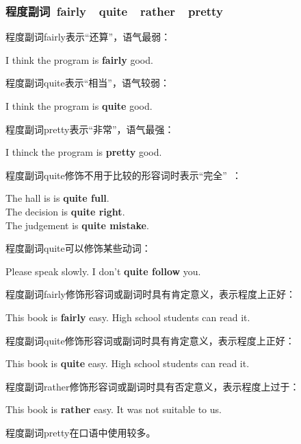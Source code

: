 \documentclass[UTF8]{ctexart}
\newcommand{\littf}[1]{{\hspace{3pt}\ttfamily #1}}
\begin{document}
\newpage

\subsubsection{程度副词~\littf{fairly}~~\littf{quite}~~\littf{rather}~~\littf{pretty}}
    程度副词\littf{fairly}表示“还算”，语气最弱：
    \begin{center}
        \large\ttfamily
        I think the program is \textbf{fairly} good.\\[8mm]
    \end{center}
    程度副词\littf{quite\hspace{7pt}}表示“相当”，语气较弱：
    \begin{center}
        \large\ttfamily
        I think the program is \textbf{quite} good.\\[8mm]
    \end{center}
    程度副词\littf{pretty}表示“非常”，语气最强：
    \begin{center}
        \large\ttfamily
        I thinck the program is \textbf{pretty} good.\\[8mm]
    \end{center}
    程度副词\littf{quite}修饰不用于比较的形容词时表示“完全”~：
    \begin{center}
        \large\ttfamily
        The hall is is \textbf{quite full}.\\[4mm]
        The decision is \textbf{quite right}.\\[4mm]
        The judgement is \textbf{quite mistake}.\\[8mm]
    \end{center}
    程度副词\littf{quite}可以修饰某些动词：
    \begin{center}
        \large\ttfamily
        Please speak slowly. I don't \textbf{quite follow} you.\\[8mm]
    \end{center}
    程度副词\littf{fairly}修饰形容词或副词时具有肯定意义，表示程度上正好：
    \begin{center}
        \large\ttfamily
        This book is \textbf{fairly} easy. High school students can read it.\\[8mm]
    \end{center}
    程度副词\littf{quite\hspace{7pt}}修饰形容词或副词时具有肯定意义，表示程度上正好：
    \begin{center}
        \large\ttfamily
        This book is \textbf{quite} easy. High school students can read it.\\[8mm]
    \end{center}
    程度副词\littf{rather}修饰形容词或副词时具有否定意义，表示程度上过于：
    \begin{center}
        \large\ttfamily
        This book is \textbf{rather} easy. It was not suitable to us.\\[6mm]
    \end{center}
    程度副词\littf{pretty}在口语中使用较多。
\end{document}

